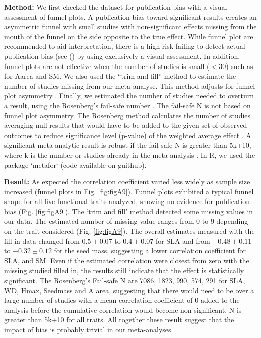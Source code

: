 \documentclass[a4paper,11pt]{article}
\begin{document}
\begin{appendices}
\textbf{Method:} We first checked the dataset for publication bias with a visual assessment of funnel plots. A publication bias toward significant results creates an asymmetric funnel with small studies with non-significant effects missing from the mouth of the funnel on the side opposite to the true effect. While funnel plot are recommended to aid interpretation, there is a high risk failing to detect actual publication bias (see (\citealt{Koricheva:2013tz}) by using exclusively a visual assessment. In addition, funnel plots are not effective when the number of studies is small ($<30$) such as for Aarea and SM.
We also used the ``trim and fill'' method to estimate the number of studies missing from our meta-analyse. This method adjusts for funnel plot asymmetry \citep{Duval:2000dg}.
Finally, we estimated the number of studies needed to overturn a result, using the Rosenberg’s fail-safe number \citep{Rosenberg:2005hk}. The fail-safe N is not based on funnel plot asymmetry. The Rosenberg method calculates the number of studies averaging null results that would have to be added to the given set of observed outcomes to reduce significance level (p-value) of the weighted average effect \citep{Rosenberg:2005hk}. A significant meta-analytic result is robust if the fail-safe N is greater than 5k+10, where k is the number or studies already in the meta-analysis \citep{Rosenthal:1979do}.
In R, we used the package `metafor` (code available on guithub).

\textbf{Result:} As expected the correlation coefficient varied less widely as sample size increased (funnel plots in Fig. \ref{fig:figA9}). Funnel plots exhibited a typical funnel shape for all five functional traits analyzed, showing no evidence for publication bias (Fig. \ref{fig:figA9}).
The ‘trim and fill’ method detected some missing values in our data. The estimated number of missing value ranges from 0 to 9 depending on the trait considered (Fig. \ref{fig:figA9}). The overall estimates measured with the fill in data changed from $0.5 \pm 0.07$  to $0.4 \pm 0.07$  for SLA and from $-0.48 \pm 0.11$  to $-0.32 \pm 0.12$  for the seed mass, suggesting a lower correlation coefficient for SLA, and SM. Even if the estimated correlation were closest from zero with the missing studied filled in, the results still indicate that the effect is statistically significant.
The Rosenberg’s Fail-safe N are 7086, 1823, 990, 574, 291 for SLA, WD, Hmax, Seedmass and A area, suggesting that there would need to be over a large number of studies with a mean correlation coefficient of 0 added to the analysis before the cumulative correlation would become non significant. N is greater than 5k+10 for all traits.
All together these result suggest that the impact of bias is probably trivial in our meta-analyses.


\end{appendices}
\end{document}
